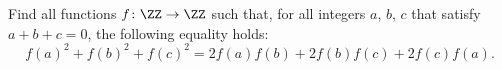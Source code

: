 Find all functions $f \colon \ZZ \to \ZZ$ such that,
for all integers $a$, $b$, $c$ that satisfy $a+b+c=0$,
the following equality holds:
\[ f(a)^2+f(b)^2+f(c)^2 = 2f(a)f(b)+2f(b)f(c)+2f(c)f(a). \]